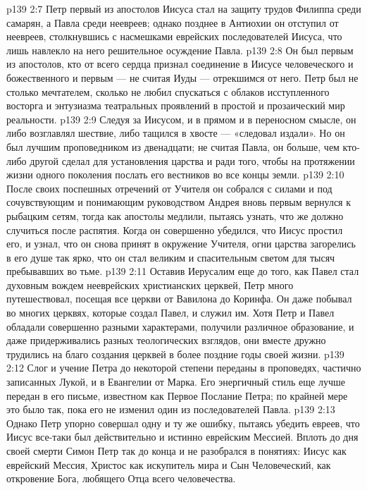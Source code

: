 \vs p139 2:7 Петр первый из апостолов Иисуса стал на защиту трудов Филиппа среди самарян, а Павла среди неевреев; однако позднее в Антиохии он отступил от неевреев, столкнувшись с насмешками еврейских последователей Иисуса, что лишь навлекло на него решительное осуждение Павла.
\vs p139 2:8 Он был первым из апостолов, кто от всего сердца признал соединение в Иисусе человеческого и божественного и первым --- не считая Иуды --- отрекшимся от него. Петр был не столько мечтателем, сколько не любил спускаться с облаков исступленного восторга и энтузиазма театральных проявлений в простой и прозаический мир реальности.
\vs p139 2:9 Следуя за Иисусом, и в прямом и в переносном смысле, он либо возглавлял шествие, либо тащился в хвосте --- «следовал издали». Но он был лучшим проповедником из двенадцати; не считая Павла, он больше, чем кто\hyp{}либо другой сделал для установления царства и ради того, чтобы на протяжении жизни одного поколения послать его вестников во все концы земли.
\vs p139 2:10 После своих поспешных отречений от Учителя он собрался с силами и под сочувствующим и понимающим руководством Андрея вновь первым вернулся к рыбацким сетям, тогда как апостолы медлили, пытаясь узнать, что же должно случиться после распятия. Когда он совершенно убедился, что Иисус простил его, и узнал, что он снова принят в окружение Учителя, огни царства загорелись в его душе так ярко, что он стал великим и спасительным светом для тысяч пребывавших во тьме.
\vs p139 2:11 \pc Оставив Иерусалим еще до того, как Павел стал духовным вождем нееврейских христианских церквей, Петр много путешествовал, посещая все церкви от Вавилона до Коринфа. Он даже побывал во многих церквях, которые создал Павел, и служил им. Хотя Петр и Павел обладали совершенно разными характерами, получили различное образование, и даже придерживались разных теологических взглядов, они вместе дружно трудились на благо создания церквей в более поздние годы своей жизни.
\vs p139 2:12 \pc Слог и учение Петра до некоторой степени переданы в проповедях, частично записанных Лукой, и в Евангелии от Марка. Его энергичный стиль еще лучше передан в его письме, известном как Первое Послание Петра; по крайней мере это было так, пока его не изменил один из последователей Павла.
\vs p139 2:13 Однако Петр упорно совершал одну и ту же ошибку, пытаясь убедить евреев, что Иисус все\hyp{}таки был действительно и истинно еврейским Мессией. Вплоть до дня своей смерти Симон Петр так до конца и не разобрался в понятиях: Иисус как еврейский Мессия, Христос как искупитель мира и Сын Человеческий, как откровение Бога, любящего Отца всего человечества.
